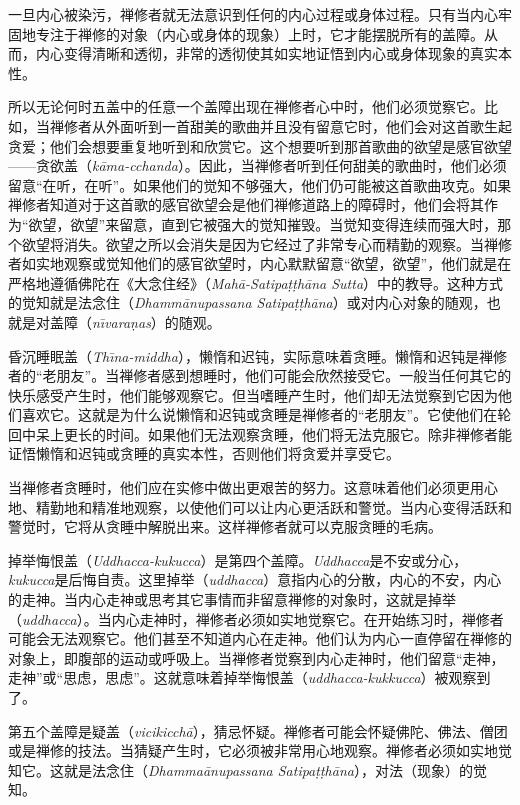 一旦内心被染污，禅修者就无法意识到任何的内心过程或身体过程。只有当内心牢固地专注于禅修的对象（内心或身体的现象）上时，它才能摆脱所有的盖障。从而，内心变得清晰和透彻，非常的透彻使其如实地证悟到内心或身体现象的真实本性。

所以无论何时五盖中的任意一个盖障出现在禅修者心中时，他们必须觉察它。比如，当禅修者从外面听到一首甜美的歌曲并且没有留意它时，他们会对这首歌生起贪爱；他们会想要重复地听到和欣赏它。这个想要听到那首歌曲的欲望是感官欲望——贪欲盖（{\it k\=ama-\1cchanda}）。因此，当禅修者听到任何甜美的歌曲时，他们必须留意“在听，在听”。如果他们的觉知不够强大，他们仍可能被这首歌曲攻克。如果禅修者知道对于这首歌的感官欲望会是他们禅修道路上的障碍时，他们会将其作为“欲望，欲望”来留意，直到它被强大的觉知摧毁。当觉知变得连续而强大时，那个欲望将消失。欲望之所以会消失是因为它经过了非常专心而精勤的观察。当禅修者如实地观察或觉知他们的感官欲望时，内心默默留意“欲望，欲望”，他们就是在严格地遵循佛陀在《大念住经》（{\it Mah\=a-Satipa\d t\d th\=ana Sutta}）中的教导。这种方式的觉知就是法念住（{\it Dhamm\=anupassana Satipa\d t\d th\=ana}）或对内心对象的随观，也就是对盖障（{\it n\=\i vara\d nas}）的随观。

昏沉睡眠盖（{\it Th\=\i na-middha}），懒惰和迟钝，实际意味着贪睡。懒惰和迟钝是禅修者的“老朋友”。当禅修者感到想睡时，他们可能会欣然接受它。一般当任何其它的快乐感受产生时，他们能够观察它。但当嗜睡产生时，他们却无法觉察到它因为他们喜欢它。这就是为什么说懒惰和迟钝或贪睡是禅修者的“老朋友”。它使他们在轮回中呆上更长的时间。如果他们无法观察贪睡，他们将无法克服它。除非禅修者能证悟懒惰和迟钝或贪睡的真实本性，否则他们将贪爱并享受它。

当禅修者贪睡时，他们应在实修中做出更艰苦的努力。这意味着他们必须更用心地、精勤地和精准地观察，以使他们可以让内心更活跃和警觉。\1当内心变得活跃和警觉时，它将从贪睡中解脱出来。这样禅修者就可以克服贪睡的毛病。

掉举悔恨盖（{\it Uddhacca-kukucca}）是第四个盖障。{\it Uddhacca}是不安或分心，{\it kukucca}是后悔自责。这里掉举（{\it uddhacca}）意指内心的分散，内心的不安，内心的走神。当内心走神或思考其它事情而非留意禅修的对象时，这就是掉举（{\it uddhacca}）。当内心走神时，禅修者必须如实地觉察它。在开始练习时，禅修者可能会无法观察它。他们甚至不知道内心在走神。他们认为内心一直停留在禅修的对象上，即腹部的运动或呼吸上。当禅修者觉察到内心走神时，他们留意“走神，走神”或“思虑，思虑”。这就意味着掉举悔恨盖（{\it uddhacca-kukkucca}）被观察到了。

第五个盖障是疑盖（{\it vicikicch\=a}），猜忌怀疑。禅修者可能会怀疑佛陀、佛法、僧团或是禅修的技法。当猜疑产生时，它必须被非常用心地观察。禅修者必须如实地觉知它。这就是法念住（{\it Dhamma\=anupassana Satipa\d t\d th\=ana}），对法（现象）的觉知。

